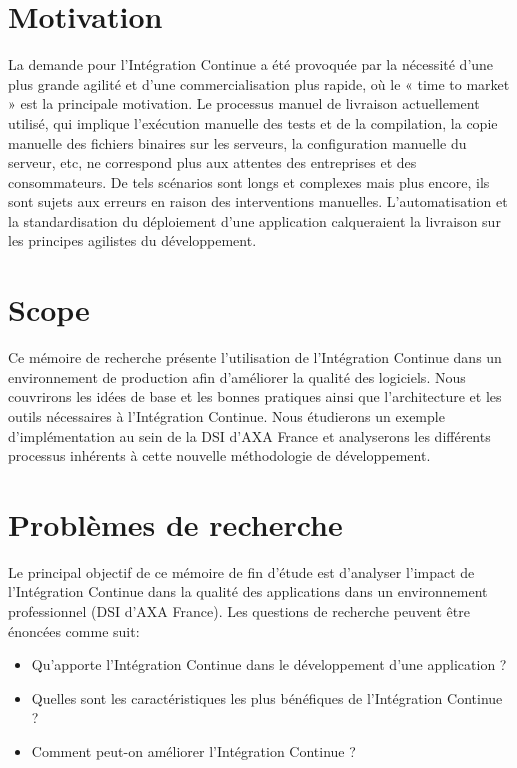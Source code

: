 \documentclass{report}
\begin{document}
    \section{Motivation}
    La demande pour l'Intégration Continue a été provoquée par la nécessité d'une plus grande agilité et d'une commercialisation plus rapide, où le « time to market » est la principale motivation. Le processus manuel de livraison actuellement utilisé, qui implique l'exécution manuelle des tests et de la compilation, la copie manuelle des fichiers binaires sur les serveurs, la configuration manuelle du serveur, etc, ne correspond plus aux attentes des entreprises et des consommateurs. De tels scénarios sont longs et complexes mais plus encore, ils sont sujets aux erreurs en raison des interventions manuelles. L'automatisation et la standardisation du déploiement d'une application calqueraient la livraison sur les principes agilistes du développement.

    \section{Scope}
    Ce mémoire de recherche présente l'utilisation de l'Intégration Continue dans un environnement de production afin d'améliorer la qualité des logiciels. Nous couvrirons les idées de base et les bonnes pratiques ainsi que l'architecture et les outils nécessaires à l'Intégration Continue. Nous étudierons un exemple d'implémentation au sein de la DSI d'AXA France et analyserons les différents processus inhérents à cette nouvelle méthodologie de développement.

    \section{Problèmes de recherche}
    Le principal objectif de ce mémoire de fin d'étude est d'analyser l'impact de l'Intégration Continue dans la qualité des applications dans un environnement professionnel (DSI d'AXA France). Les questions de recherche peuvent être énoncées comme suit:\\
    \begin{itemize}
      \item Qu'apporte l'Intégration Continue dans le développement d'une application ?
      \item Quelles sont les caractéristiques les plus bénéfiques de l'Intégration Continue ?
      \item Comment peut-on améliorer l'Intégration Continue ?\\
    \end{itemize}
\end{document}
